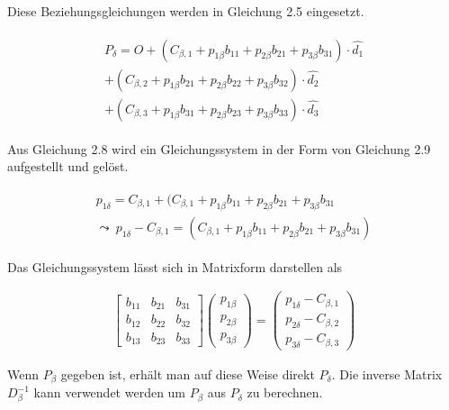 Diese Beziehungsgleichungen werden in Gleichung 2.5 eingesetzt.

\begin{gather}
	\begin{split}
		P_\delta = O + (C_{\beta,1} + p_{1\beta}b_{11} +  p_{2\beta}b_{21} + p_{3\beta}b_{31}) \cdot \hat{d_1}\\
		+(C_{\beta,2} + p_{1\beta}b_{21} +  p_{2\beta}b_{22} + p_{3\beta}b_{32} )\cdot \hat{d_2}\\
		+ (C_{\beta,3} + p_{1\beta}b_{31} +  p_{2\beta}b_{23} + p_{3\beta}b_{33} )\cdot \hat{d_3}
	\end{split}
\end{gather}

Aus Gleichung 2.8 wird ein Gleichungssystem in der Form von Gleichung 2.9 aufgestellt und gelöst.

\begin{gather}
	\begin{split}
		p_{1\delta} = C_{\beta,1} + (C_{\beta,1} + p_{1\beta}b_{11} +  p_{2\beta}b_{21} + p_{3\beta}b_{31} \\
		\leadsto \: p_{1\delta} - C_{\beta,1} =  (C_{\beta,1} + p_{1\beta}b_{11} +  p_{2\beta}b_{21} + p_{3\beta}b_{31})
	\end{split}
\end{gather}

Das Gleichungssystem lässt sich in Matrixform darstellen als 

\begin{gather}
	\begin{bmatrix}b_{11} & b_{21} & b_{31}\\
		b_{12} & b_{22} & b_{32}\\
		b_{13} & b_{23} & b_{33}
	\end{bmatrix} 
	\begin{pmatrix}
		p_{1\beta}\\p_{2\beta}\\ p_{3\beta}
	\end{pmatrix} = 
	\begin{pmatrix}
		p_{1\delta} - C_{\beta,1}\\
		p_{2\delta} - C_{\beta,2}\\
		p_{3\delta} - C_{\beta,3}
	\end{pmatrix}
\end{gather}

Wenn $P_\beta$ gegeben ist, erhält man auf diese Weise direkt $P_\delta$. Die inverse Matrix $\ensuremath{D_\beta^{-1}}$ kann verwendet werden um  $P_\beta$ aus $P_\delta$ zu berechnen. 

